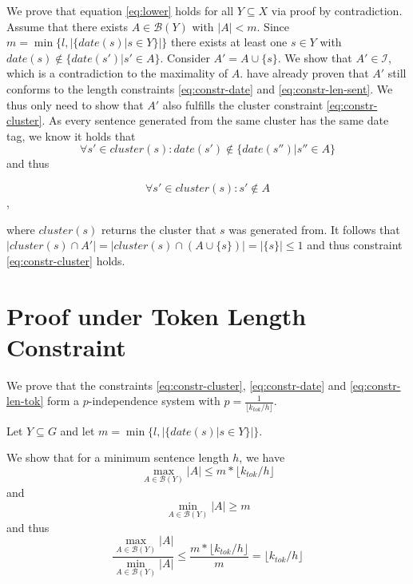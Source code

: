 \documentclass[a4paper,BCOR=10mm]{report}
\numberwithin{lemma}{chapter}
\numberwithin{definition}{chapter}
\begin{document}
\begin{appendices}
We prove that equation \ref{eq:lower} holds for all $Y \subseteq X$ via proof by contradiction.
Assume that there exists $A \in \mathcal{B}(Y)$ with $|A| < m$.
Since $m = \min \{ l, |\{\mathit{date}(s) | s \in Y\}| \}$ there exists at least one $s \in Y$ with $\mathit{date}(s) \not\in \{\mathit{date}(s') | s' \in A\}$.
Consider $A' = A \cup \{ s \}$. We show that $A' \in \mathcal{I}$, which is a contradiction to the maximality of $A$. \citet{markert} have already proven that $A'$ still conforms to the length constraints \ref{eq:constr-date} and \ref{eq:constr-len-sent}.
We thus only need to show that $A'$ also fulfills the cluster constraint \ref{eq:constr-cluster}.
As every sentence generated from the same cluster has the same date tag, we know it holds that
\begin{equation}
\forall s' \in \mathit{cluster}(s): \mathit{date}(s') \not\in \{\mathit{date}(s'') | s'' \in A \}
\end{equation}
and thus

\begin{equation}
\forall s' \in \mathit{cluster}(s) : s' \not\in A
\end{equation},

where $\mathit{cluster}(s)$ returns the cluster that $s$ was generated from.
It follows that $|\mathit{cluster}(s) \cap A'| = |\mathit{cluster}(s) \cap (A \cup \{ s \})| = |\{s\}| \leq 1$ and thus constraint \ref{eq:constr-cluster} holds.


\section{Proof under Token Length Constraint}

We prove that the constraints \ref{eq:constr-cluster}, \ref{eq:constr-date} and \ref{eq:constr-len-tok} form a $p$-independence system with $p = \frac{1}{\lfloor k_{tok} / h \rfloor}$.

Let $Y \subseteq G$ and let $m = \min \{ l, |\{\mathit{date}(s) | s \in Y\}| \}$.

We show that for a minimum sentence length $h$, we have 
\begin{equation}
\max_{A \in \mathcal{B}(Y)} |A| \leq m * \lfloor k_{tok} / h \rfloor
\end{equation}
and
\begin{equation}
    \min_{A \in \mathcal{B}(Y)} |A| \geq m
\end{equation}
and thus
\begin{equation}
\frac{\max_{A \in \mathcal{B}(Y)} |A|}{\min_{A \in \mathcal{B}(Y)} |A|}
\leq \frac{m * \lfloor k_{tok} / h \rfloor}{m} = \lfloor k_{tok} / h \rfloor
\end{equation}


\end{appendices}
\end{document}
